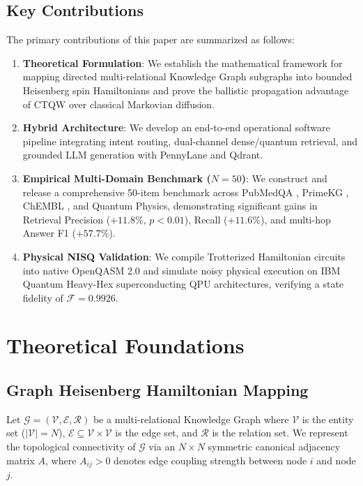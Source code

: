 \documentclass[runningheads]{llncs}
\begin{document}
\subsection{Key Contributions}
The primary contributions of this paper are summarized as follows:
\begin{enumerate}
    \item \textbf{Theoretical Formulation}: We establish the mathematical framework for mapping directed multi-relational Knowledge Graph subgraphs into bounded Heisenberg spin Hamiltonians and prove the ballistic propagation advantage of CTQW over classical Markovian diffusion.
    \item \textbf{Hybrid Architecture}: We develop an end-to-end operational software pipeline integrating intent routing, dual-channel dense/quantum retrieval, and grounded LLM generation with PennyLane and Qdrant.
    \item \textbf{Empirical Multi-Domain Benchmark ($N=50$)}: We construct and release a comprehensive 50-item benchmark across PubMedQA \cite{jin2019pubmedqa}, PrimeKG \cite{chandak2023building}, ChEMBL \cite{gaulton2012chembl}, and Quantum Physics, demonstrating significant gains in Retrieval Precision ($+11.8\%$, $p < 0.01$), Recall ($+11.6\%$), and multi-hop Answer F1 ($+57.7\%$).
    \item \textbf{Physical NISQ Validation}: We compile Trotterized Hamiltonian circuits into native OpenQASM 2.0 and simulate noisy physical execution on IBM Quantum Heavy-Hex superconducting QPU architectures, verifying a state fidelity of $\mathcal{F} = 0.9926$.
\end{enumerate}

\section{Theoretical Foundations}

\subsection{Graph Heisenberg Hamiltonian Mapping}
Let $\mathcal{G} = (\mathcal{V}, \mathcal{E}, \mathcal{R})$ be a multi-relational Knowledge Graph where $\mathcal{V}$ is the entity set ($|\mathcal{V}| = N$), $\mathcal{E} \subseteq \mathcal{V} \times \mathcal{V}$ is the edge set, and $\mathcal{R}$ is the relation set. We represent the topological connectivity of $\mathcal{G}$ via an $N \times N$ symmetric canonical adjacency matrix $A$, where $A_{ij} > 0$ denotes edge coupling strength between node $i$ and node $j$.
\end{document}
